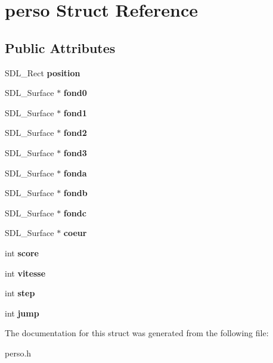 \hypertarget{structperso}{}\section{perso Struct Reference}
\label{structperso}
\subsection*{Public Attributes}
\begin{DoxyCompactItemize}
\item 
\mbox{\label{structperso_a74aed265eb926987cf218b19d163c746}} 
S\+D\+L\+\_\+\+Rect {\bfseries position}
\item 
\mbox{\label{structperso_a08c74faf3f88be57cf3a74045d4516b4}} 
S\+D\+L\+\_\+\+Surface $\ast$ {\bfseries fond0}
\item 
\mbox{\label{structperso_ad396706f66a5d6c81b71a27b2eec9e02}} 
S\+D\+L\+\_\+\+Surface $\ast$ {\bfseries fond1}
\item 
\mbox{\label{structperso_ac0a45d49ba5381c604c01a39596e55f7}} 
S\+D\+L\+\_\+\+Surface $\ast$ {\bfseries fond2}
\item 
\mbox{\label{structperso_a6445f715e75440295b6acb1e6975fcb9}} 
S\+D\+L\+\_\+\+Surface $\ast$ {\bfseries fond3}
\item 
\mbox{\label{structperso_aad23cb6acdce0282ea32c0ed5d807809}} 
S\+D\+L\+\_\+\+Surface $\ast$ {\bfseries fonda}
\item 
\mbox{\label{structperso_a436b5abedfc6ba00785a3cf4ff6bc32c}} 
S\+D\+L\+\_\+\+Surface $\ast$ {\bfseries fondb}
\item 
\mbox{\label{structperso_ac022be57eda44dffb7cd61238105d829}} 
S\+D\+L\+\_\+\+Surface $\ast$ {\bfseries fondc}
\item 
\mbox{\label{structperso_a8c017c6a1eea66543038773ee632c8e2}} 
S\+D\+L\+\_\+\+Surface $\ast$ {\bfseries coeur}
\item 
\mbox{\label{structperso_a49e19e00dfbdcd05d21a5ba7df809708}} 
int {\bfseries score}
\item 
\mbox{\label{structperso_af3820e5d5cc757639f1587bf06591e85}} 
int {\bfseries vitesse}
\item 
\mbox{\label{structperso_a2599c7e9f80d4b634cadf0cbd2ede783}} 
int {\bfseries step}
\item 
\mbox{\label{structperso_a41362c60ce965d63463fb5fe4aefb519}} 
int {\bfseries jump}
\end{DoxyCompactItemize}


The documentation for this struct was generated from the following file\+:\begin{DoxyCompactItemize}
\item 
perso.\+h\end{DoxyCompactItemize}
